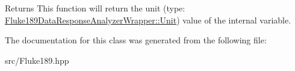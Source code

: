 \label{classFluke_1_1Fluke189QD0Logging_a7d50361ed373ebaf4bf9cd7bf101f93d}
\begin{DoxyReturn}{Returns}
This function will return the unit (type: \hyperlink{classFluke_1_1Fluke189DataResponseAnalyzerWrapper_ab8e5f2306e4d2ad3d741d273793aaed1}{Fluke189DataResponseAnalyzerWrapper::Unit}) value of the internal variable. 
\end{DoxyReturn}


The documentation for this class was generated from the following file:\begin{DoxyCompactItemize}
\item 
src/Fluke189.hpp\end{DoxyCompactItemize}

